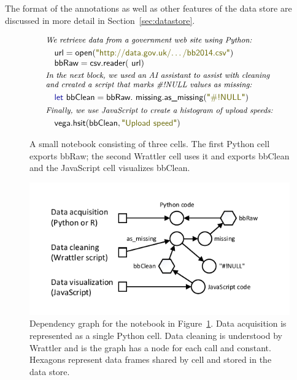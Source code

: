 \documentclass[sigplan,preprint,10pt]{acmart}\settopmatter{printfolios=true,printccs=false,printacmref=false}
\theoremstyle{plain}
\theoremstyle{definition}
\newcommand{\str}[1]{\textnormal{\textcolor{strclr}{\sffamily "#1"}}}
\newcommand{\ident}[1]{\textnormal{\sffamily #1}}
\newcommand{\kvd}[1]{\textnormal{\textcolor{kvdclr}{\sffamily #1}}}
\begin{document}
\noindent
The format of the annotations as well as other features of the data store are discussed in
more detail in Section~\ref{sec:datastore}.

\begin{figure}
\begin{equation*}
\begin{array}{l}
\textit{\small{We retrieve data from a government web site using Python:}}\\[0.3em]
\quad\ident{url}=\ident{open}(\str{http://data.gov.uk/\ldots/bb2014.csv})\\
\quad\ident{bbRaw}=\ident{csv.reader}(\ident{url})\\[0.2em]
\textit{\small{In the next block, we used an AI assistant to assist with cleaning}}\\[-0.1em]
\textit{\small{and created a script that marks \#!NULL values as missing:}}\\[0.3em]
\quad\kvd{let}~\ident{bbClean} = \ident{bbRaw}.\ident{missing}.\ident{as\_missing}(\str{\#!NULL})\\[0.3em]
\textit{\small{Finally, we use JavaScript to create a histogram of upload speeds:}}\\[0.3em]
\quad\ident{vega}.\ident{hsit}(\ident{bbClean}, \str{Upload speed})
\end{array}
\end{equation*}
\vspace{-0.5em}
\caption{\small{A small notebook consisting of three cells. The first Python cell exports
\ident{bbRaw}; the second Wrattler cell uses it and exports \ident{bbClean} and the
JavaScript cell visualizes \ident{bbClean}.}}
\label{fig:notebook}
\end{figure}
\begin{figure}
\includegraphics[scale=1,trim=0.5cm 0.5cm 0.5cm 0.5cm]{graph.pdf}

\caption{\small{Dependency graph for the notebook in Figure~\ref{fig:notebook}.
Data acquisition is represented as a single Python cell. Data cleaning is understood
by Wrattler and is the graph has a node for each call and constant. Hexagons represent
data frames shared by cell and stored in the data store.}}
\label{fig:deps}
\vspace{-0.5em}
\end{figure}
\end{document}
